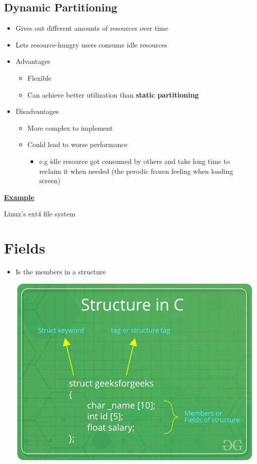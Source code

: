 \documentclass[12pt]{article}
\begin{document}
\subsection{Dynamic Partitioning}

\begin{itemize}
    \item Gives out different amounts of resources over time
    \item Lets resource-hungry users consume idle resources
    \item Advantages
    \begin{itemize}
        \item Flexible
        \item Can achieve better utilization than \textbf{static partitioning}
    \end{itemize}
    \item Disadvantages
    \begin{itemize}
        \item More complex to implement
        \item Could lead to worse performance
        \begin{itemize}
            \item e.g idle resource got consumed by others and take long
            time to reclaim it when needed (the perodic frozen feeling when loading screen)
        \end{itemize}
    \end{itemize}
\end{itemize}

\bigskip

\underline{\textbf{Example}}

\bigskip

Linux's ext4 file system

\section{Fields}

\begin{itemize}
    \item Is the members in a structure

    \bigskip

    \begin{center}
    \includegraphics[width=0.6\linewidth]{../images/midterm_2_solution_33.png}
    \end{center}
\end{itemize}
\end{document}
